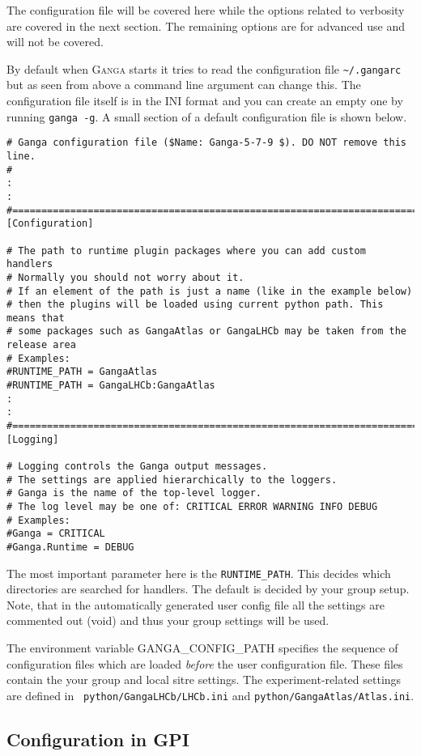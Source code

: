 \documentclass{howto}
\def\ganga {\textsc{Ganga}\xspace}
\begin{document}
The configuration file will be covered here while the options related to
verbosity are covered in the next section. The remaining options are for
advanced use and will not be covered.

By default when \ganga starts  it tries to read the configuration file
\texttt{\~{}/.gangarc} but  as seen from  above a command  line argument
can change  this. The configuration file  itself is in  the INI format
and you can create an empty  one by running \texttt{ganga -g}. A small
section of a default configuration file is shown below.

\begin{verbatim}
# Ganga configuration file ($Name: Ganga-5-7-9 $). DO NOT remove this line.
#
:
:
#=======================================================================
[Configuration]

# The path to runtime plugin packages where you can add custom handlers
# Normally you should not worry about it.
# If an element of the path is just a name (like in the example below)
# then the plugins will be loaded using current python path. This means that
# some packages such as GangaAtlas or GangaLHCb may be taken from the release area
# Examples:
#RUNTIME_PATH = GangaAtlas
#RUNTIME_PATH = GangaLHCb:GangaAtlas
:
:
#=======================================================================
[Logging]

# Logging controls the Ganga output messages.
# The settings are applied hierarchically to the loggers.
# Ganga is the name of the top-level logger.
# The log level may be one of: CRITICAL ERROR WARNING INFO DEBUG
# Examples:
#Ganga = CRITICAL
#Ganga.Runtime = DEBUG
\end{verbatim}

The most  important parameter here is  the \texttt{RUNTIME_PATH}. This
decides which  directories are searched  for handlers. The  default is
decided by your group setup. Note, that in the automatically generated
user config  file all the settings  are commented out  (void) and thus
your group settings will be used. 

The environment  variable GANGA_CONFIG_PATH specifies  the sequence of
configuration   files  which   are  loaded   {\it  before}   the  user
configuration  file.  These  files contain  the your  group  and local
sitre settings.   The experiment-related settings are  defined in {\tt
python/GangaLHCb/LHCb.ini} and {\tt python/GangaAtlas/Atlas.ini}.

\subsection{Configuration in GPI}
\end{document}
